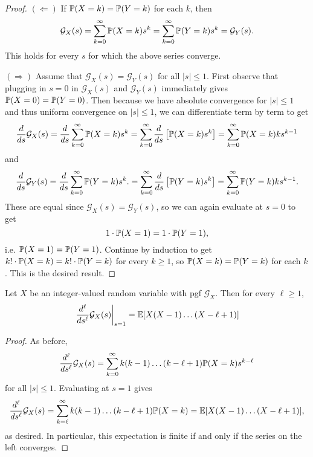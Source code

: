 \begin{proof}
  $(\Leftarrow)$ If $\mathbb{P}(X = k) = \mathbb{P}(Y = k)$ for
  each $k$, then
  \[
    \mathcal{G}_X(s)
    = \sum_{k = 0}^\infty \mathbb{P}(X = k) s^k
    = \sum_{k = 0}^\infty \mathbb{P}(Y = k) s^k
    = \mathcal{G}_Y(s).
  \]
  This holds for every $s$ for which the above series
  converge.

  $(\Rightarrow)$ Assume that
  $\mathcal{G}_X(s) = \mathcal{G}_Y(s)$ for all
  $|s| \le 1$. First observe that
  plugging in $s = 0$ in $\mathcal{G}_X(s)$
  and $\mathcal{G}_Y(s)$ immediately
  gives $\mathbb{P}(X = 0) = \mathbb{P}(Y = 0)$. Then
  because we have absolute convergence
  for $|s| \le 1$ and thus uniform convergence
  on $|s| \le 1$, we can differentiate
  term by term to get
  \[
    \frac{d}{ds} \mathcal{G}_X(s)
    = \frac{d}{ds} \sum_{k = 0}^\infty \mathbb{P}(X = k) s^k
    = \sum_{k = 0}^\infty \frac{d}{ds} \left[\mathbb{P}(X = k) s^k\right]
    = \sum_{k = 0}^\infty \mathbb{P}(X = k) k s^{k - 1}
  \]
  and
  \[
    \frac{d}{ds} \mathcal{G}_Y(s)
    = \frac{d}{ds} \sum_{k = 0}^\infty \mathbb{P}(Y = k) s^k.
    = \sum_{k = 0}^\infty \frac{d}{ds} \left[\mathbb{P}(Y = k) s^k\right]
    = \sum_{k = 0}^\infty \mathbb{P}(Y = k) k s^{k - 1}.
  \]
  These are equal since $\mathcal{G}_X(s) = \mathcal{G}_Y(s)$, so
  we can again evaluate at $s = 0$ to get
  \[
    1 \cdot \mathbb{P}(X = 1) = 1 \cdot \mathbb{P}(Y = 1),
  \]
  i.e. $\mathbb{P}(X = 1) = \mathbb{P}(Y = 1)$. Continue
  by induction to get $k! \cdot \mathbb{P}(X = k) = k! \cdot \mathbb{P}(Y = k)$
  for every $k \ge 1$, so $\mathbb{P}(X = k) = \mathbb{P}(Y = k)$
  for each $k$. This is the desired result.
\end{proof}

\begin{theorem}
  Let $X$ be an integer-valued random variable
  with pgf $\mathcal{G}_X$. Then for every
  $\ell \ge 1$,
  \[
    \left.\frac{d^\ell}{ds^\ell} \mathcal{G}_X(s)\right|_{s = 1}
      = \mathbb{E}[X(X - 1) \dots (X - \ell + 1)]
  \]
\end{theorem}

\begin{proof}
  As before,
  \[
    \frac{d^\ell}{ds^\ell} \mathcal{G}_X(s)
    = \sum_{k = 0}^\infty k(k - 1) \dots (k - \ell + 1)
    \mathbb{P}(X = k) s^{k - \ell}
  \]
  for all $|s| \le 1$. Evaluating at $s = 1$ gives
  \[
    \frac{d^\ell}{ds^\ell} \mathcal{G}_X(s)
    = \sum_{k = \ell}^\infty k(k - 1) \dots (k - \ell + 1) \mathbb{P}(X = k)
    = \mathbb{E}[X(X - 1) \dots (X - \ell + 1)],
  \]
  as desired. In particular, this expectation
  is finite if and only if the series on the
  left converges.
\end{proof}

